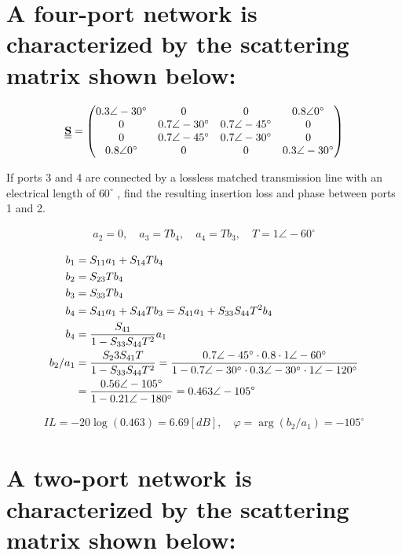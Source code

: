 \documentclass[12pt, letterpaper]{article}
\begin{document}
\section{A four-port network is characterized by the scattering matrix shown below:}

\begin{align}
  \underline{\underline{\vb{S}}}=
  \begin{pmatrix}
    0.3\angle-30^{\circ} & 0 & 0 & 0.8\angle0^{\circ} \\
    0 & 0.7\angle-30^{\circ} & 0.7\angle-45^{\circ} & 0 \\
    0 & 0.7\angle-45^{\circ} & 0.7\angle-30^{\circ} & 0 \\
    0.8\angle0^{\circ} & 0 & 0 & 0.3\angle-30^{\circ} \\
  \end{pmatrix}
\end{align}

If ports 3 and 4 are connected by a lossless matched transmission line with an electrical length of $60^{\circ}$ , find the resulting insertion loss and phase between ports 1 and 2.

\begin{align}
  a_2=0, \quad a_3=Tb_4, \quad a_4=Tb_3, \quad T=1\angle-60^{\circ}
\end{align}

\begin{align}
  b_1&=S_{11}a_1+S_{14}Tb_4\\
  b_2&=S_{23}Tb_4\\
  b_3&=S_{33}Tb_4\\
  b_4&=S_{41}a_1+S_{44}Tb_3=S_{41}a_1+S_{33}S_{44}T^2b_4\\
  b_4&={S_{41}\over1-S_{33}S_{44}T^2}a_1\\
  b_2/a_1&={S_23S_{41}T\over 1-S_{33}S_{44}T^2}
  ={0.7\angle-45^{\circ}\cdot0.8\cdot1\angle-60^{\circ}\over1-0.7\angle-30^{\circ}\cdot0.3\angle-30^{\circ}\cdot1\angle-120^{\circ}}\\
  &={0.56\angle-105^{\circ}\over1-0.21\angle-180^{\circ}}=0.463\angle-105^{\circ}
\end{align}

\begin{align}
  IL=-20\log(0.463)=6.69[dB], \quad \varphi=\arg(b_2/a_1)=-105^{\circ}
\end{align}

\section{A two-port network is characterized by the scattering matrix shown below:}
\end{document}
